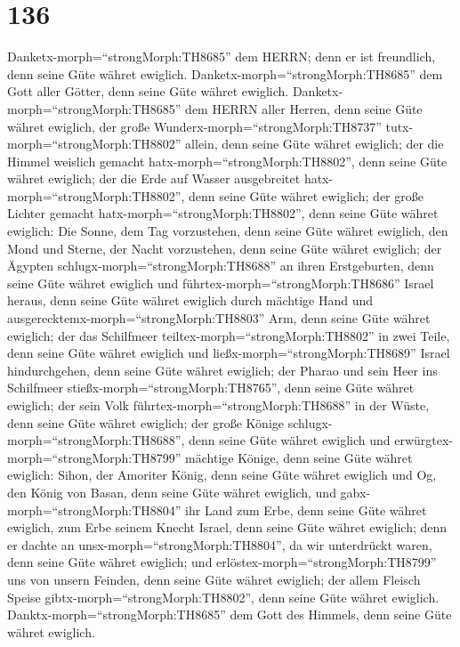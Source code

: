 \hypertarget{section-135}{%
\section{136}\label{section-135}}

 Danketx-morph=``strongMorph:TH8685'' dem HERRN; denn er ist
freundlich, denn seine Güte währet ewiglich. 
Danketx-morph=``strongMorph:TH8685'' dem Gott aller Götter, denn seine
Güte währet ewiglich.  Danketx-morph=``strongMorph:TH8685''
dem HERRN aller Herren, denn seine Güte währet ewiglich, 
der große Wunderx-morph=``strongMorph:TH8737''
tutx-morph=``strongMorph:TH8802'' allein, denn seine Güte währet
ewiglich;  der die Himmel weislich gemacht
hatx-morph=``strongMorph:TH8802'', denn seine Güte währet ewiglich;
 der die Erde auf Wasser ausgebreitet
hatx-morph=``strongMorph:TH8802'', denn seine Güte währet ewiglich;
 der große Lichter gemacht
hatx-morph=``strongMorph:TH8802'', denn seine Güte währet ewiglich:
 Die Sonne, dem Tag vorzustehen, denn seine Güte währet
ewiglich,  den Mond und Sterne, der Nacht vorzustehen, denn
seine Güte währet ewiglich;  der Ägypten
schlugx-morph=``strongMorph:TH8688'' an ihren Erstgeburten, denn seine
Güte währet ewiglich  und
führtex-morph=``strongMorph:TH8686'' Israel heraus, denn seine Güte
währet ewiglich  durch mächtige Hand und
ausgerecktemx-morph=``strongMorph:TH8803'' Arm, denn seine Güte währet
ewiglich;  der das Schilfmeer
teiltex-morph=``strongMorph:TH8802'' in zwei Teile, denn seine Güte
währet ewiglich  und ließx-morph=``strongMorph:TH8689''
Israel hindurchgehen, denn seine Güte währet ewiglich;  der
Pharao und sein Heer ins Schilfmeer stießx-morph=``strongMorph:TH8765'',
denn seine Güte währet ewiglich;  der sein Volk
führtex-morph=``strongMorph:TH8688'' in der Wüste, denn seine Güte
währet ewiglich;  der große Könige
schlugx-morph=``strongMorph:TH8688'', denn seine Güte währet ewiglich
 und erwürgtex-morph=``strongMorph:TH8799'' mächtige
Könige, denn seine Güte währet ewiglich:  Sihon, der
Amoriter König, denn seine Güte währet ewiglich  und Og,
den König von Basan, denn seine Güte währet ewiglich,  und
gabx-morph=``strongMorph:TH8804'' ihr Land zum Erbe, denn seine Güte
währet ewiglich,  zum Erbe seinem Knecht Israel, denn seine
Güte währet ewiglich;  denn er dachte an
unsx-morph=``strongMorph:TH8804'', da wir unterdrückt waren, denn seine
Güte währet ewiglich;  und
erlöstex-morph=``strongMorph:TH8799'' uns von unsern Feinden, denn seine
Güte währet ewiglich;  der allem Fleisch Speise
gibtx-morph=``strongMorph:TH8802'', denn seine Güte währet ewiglich.
 Danktx-morph=``strongMorph:TH8685'' dem Gott des Himmels,
denn seine Güte währet ewiglich.

